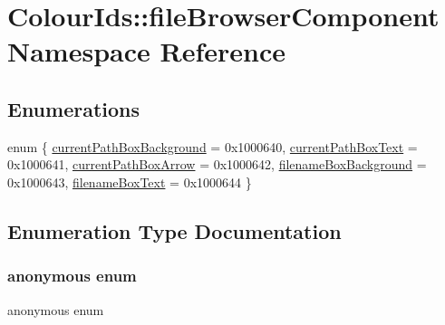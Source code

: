 \hypertarget{namespaceColourIds_1_1fileBrowserComponent}{}\section{Colour\+Ids\+:\+:file\+Browser\+Component Namespace Reference}
\label{namespaceColourIds_1_1fileBrowserComponent}
\subsection*{Enumerations}
\begin{DoxyCompactItemize}
\item 
enum \{ \newline
\mbox{\hyperlink{namespaceColourIds_1_1fileBrowserComponent_ab0e1f87fa63c58338afc7d0adc5d9a61a942fd2368370c586a870738f047cd342}{current\+Path\+Box\+Background}} = 0x1000640, 
\mbox{\hyperlink{namespaceColourIds_1_1fileBrowserComponent_ab0e1f87fa63c58338afc7d0adc5d9a61a753c4d8b5368596515ab2070f852c8c4}{current\+Path\+Box\+Text}} = 0x1000641, 
\mbox{\hyperlink{namespaceColourIds_1_1fileBrowserComponent_ab0e1f87fa63c58338afc7d0adc5d9a61a30fc4ce1c38b37aec68f7351926851d3}{current\+Path\+Box\+Arrow}} = 0x1000642, 
\mbox{\hyperlink{namespaceColourIds_1_1fileBrowserComponent_ab0e1f87fa63c58338afc7d0adc5d9a61a4ba8599e6637af53a0776ee6a8c2f834}{filename\+Box\+Background}} = 0x1000643, 
\newline
\mbox{\hyperlink{namespaceColourIds_1_1fileBrowserComponent_ab0e1f87fa63c58338afc7d0adc5d9a61a5fee6cac6bd1d568874e44e32c1be9cd}{filename\+Box\+Text}} = 0x1000644
 \}
\end{DoxyCompactItemize}


\subsection{Enumeration Type Documentation}
\mbox{\label{namespaceColourIds_1_1fileBrowserComponent_ab0e1f87fa63c58338afc7d0adc5d9a61}} 
\subsubsection{\texorpdfstring{anonymous enum}{anonymous enum}}
{\footnotesize\ttfamily anonymous enum}

